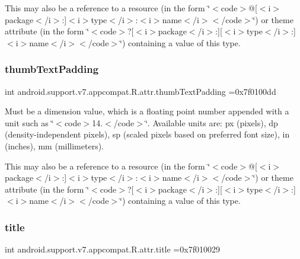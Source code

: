 This may also be a reference to a resource (in the form \char`\"{}$<$code$>$@\mbox{[}$<$i$>$package$<$/i$>$\+:\mbox{]}$<$i$>$type$<$/i$>$\+:$<$i$>$name$<$/i$>$$<$/code$>$\char`\"{}) or theme attribute (in the form \char`\"{}$<$code$>$?\mbox{[}$<$i$>$package$<$/i$>$\+:\mbox{]}\mbox{[}$<$i$>$type$<$/i$>$\+:\mbox{]}$<$i$>$name$<$/i$>$$<$/code$>$\char`\"{}) containing a value of this type. \mbox{\label{classandroid_1_1support_1_1v7_1_1appcompat_1_1R_1_1attr_a9e2343866e46c4e63f8d38f7f54cfbf5}} 
\subsubsection{\texorpdfstring{thumb\+Text\+Padding}{thumbTextPadding}}
{\footnotesize\ttfamily int android.\+support.\+v7.\+appcompat.\+R.\+attr.\+thumb\+Text\+Padding =0x7f0100dd\hspace{0.3cm}{\ttfamily [static]}}

Must be a dimension value, which is a floating point number appended with a unit such as \char`\"{}$<$code$>$14.\+5sp$<$/code$>$\char`\"{}. Available units are\+: px (pixels), dp (density-\/independent pixels), sp (scaled pixels based on preferred font size), in (inches), mm (millimeters). 

This may also be a reference to a resource (in the form \char`\"{}$<$code$>$@\mbox{[}$<$i$>$package$<$/i$>$\+:\mbox{]}$<$i$>$type$<$/i$>$\+:$<$i$>$name$<$/i$>$$<$/code$>$\char`\"{}) or theme attribute (in the form \char`\"{}$<$code$>$?\mbox{[}$<$i$>$package$<$/i$>$\+:\mbox{]}\mbox{[}$<$i$>$type$<$/i$>$\+:\mbox{]}$<$i$>$name$<$/i$>$$<$/code$>$\char`\"{}) containing a value of this type. \mbox{\label{classandroid_1_1support_1_1v7_1_1appcompat_1_1R_1_1attr_a030356582065eaa1afdf1e3e37509b4c}} 
\subsubsection{\texorpdfstring{title}{title}}
{\footnotesize\ttfamily int android.\+support.\+v7.\+appcompat.\+R.\+attr.\+title =0x7f010029\hspace{0.3cm}{\ttfamily [static]}}

